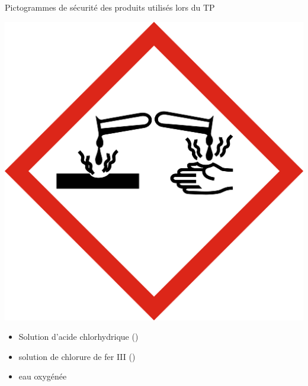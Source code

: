 \begin{doc}{Pictogrammes de sécurité des produits utilisés lors du TP}
    \begin{minipage}{0.5\linewidth}
        
        \begin{center}
            \includegraphics[scale=0.3]{Images/SGH05_Corrosion.jpg}
        \end{center}
        \begin{itemize}
            \item Solution d'acide chlorhydrique ()
            \item solution de chlorure de fer III ()
            \item eau oxygénée 
        \end{itemize}
        

\end{minipage}
\end{doc}

